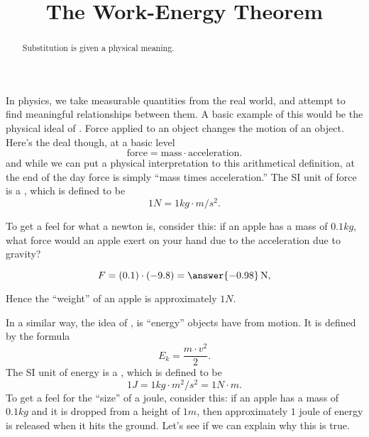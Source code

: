 \documentclass{ximera}
\title[Dig-In:]{The Work-Energy Theorem}
\begin{document}
\begin{abstract}
  Substitution is given a physical meaning. 
\end{abstract}
\maketitle

In physics, we take measurable quantities from the real world, and
attempt to find meaningful relationships between them. A basic example
of this would be the physical ideal of . Force applied to an
object changes the motion of an object. Here's the deal though, at a
basic level
\[
\mathrm{force} = \mathrm{mass} \cdot \mathrm{acceleration}.
\]
and while we can put a physical interpretation to this arithmetical
definition, at the end of the day force is simply ``mass times
acceleration.'' The SI unit of force is a , which is defined to be
\[
1\unit{N} = 1\unit{kg}\cdot \unit{m}/\unit{s}^2. 
\]
\begin{question}
  To get a feel for what a newton is, consider this: if an apple has a
  mass of $0.1\unit{kg}$, what force would an apple exert on your hand
  due to the acceleration due to gravity?
  \begin{prompt}
  \[
  F = (0.1) \cdot (-9.8) = \answer{-0.98}\unit{N},
  \]
  \end{prompt}
\begin{feedback}
  Hence the ``weight'' of an apple is approximately $1\unit{N}$.
\end{feedback}
\end{question}


In a similar way, the idea of , is ``energy''
objects have from motion. It is defined by the formula
\[
E_k = \frac{m \cdot v^2}{2}.
\]
The SI unit of energy is a , which is defined to be
\[
1\unit{J} = 1\unit{kg}\cdot \unit{m}^2/\unit{s}^2 = 1\unit{N}\cdot\unit{m}. 
\]
To get a feel for the ``size'' of a joule, consider this: if an apple
has a mass of $0.1\unit{kg}$ and it is dropped from a height of
$1\unit{m}$, then approximately $1$ joule of energy is released when
it hits the ground. Let's see if we can explain why this is true.
\end{document}
